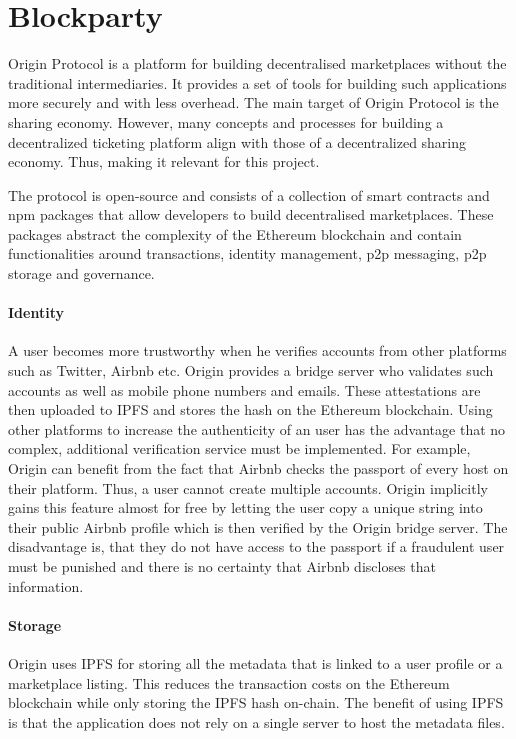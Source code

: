 
\section{Blockparty}



Origin Protocol is a platform for building decentralised marketplaces without the traditional intermediaries. It provides a set of tools for building such applications more securely and with less overhead. The main target of Origin Protocol is the sharing economy. However, many concepts and processes for building a decentralized ticketing platform align with those of a decentralized sharing economy. Thus, making it relevant for this project.

The protocol is open-source and consists of a collection of smart contracts and npm packages that allow developers to build decentralised marketplaces. These packages abstract the complexity of the Ethereum blockchain and contain functionalities around transactions, identity management, p2p messaging, p2p storage and governance.

\paragraph{Identity}
A user becomes more trustworthy when he verifies accounts from other platforms such as Twitter, Airbnb etc. Origin provides a bridge server who validates such accounts as well as mobile phone numbers and emails. These attestations are then uploaded to IPFS and stores the hash on the Ethereum blockchain. 
Using other platforms to increase the authenticity of an user has the advantage that no complex, additional verification service must be implemented. 
For example, Origin can benefit from the fact that Airbnb checks the passport of every host on their platform. Thus, a user cannot create multiple accounts. Origin implicitly gains this feature almost for free by letting the user copy a unique string into their public Airbnb profile which is then verified by the Origin bridge server.
The disadvantage is, that they do not have access to the passport if a fraudulent user must be punished and there is no certainty that Airbnb discloses that information.

\paragraph{Storage}
Origin uses IPFS for storing all the metadata that is linked to a user profile or a marketplace listing. This reduces the transaction costs on the Ethereum blockchain while only storing the IPFS hash on-chain. The benefit of using IPFS is that the application does not rely on a single server to host the metadata files. 


